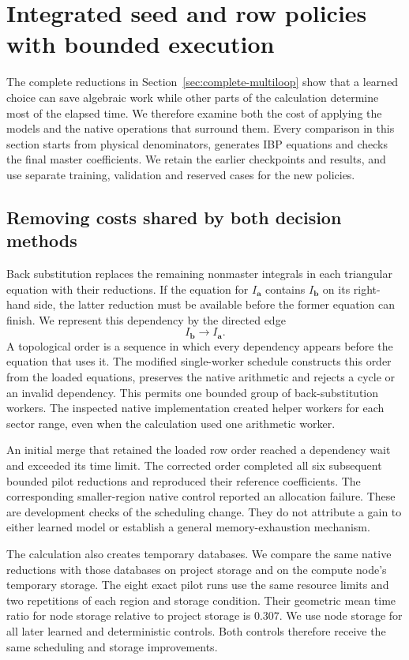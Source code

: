 \section{Integrated seed and row policies with bounded execution}
\label{sec:integrated-runtime}
The complete reductions in Section~\ref{sec:complete-multiloop} show that a learned
choice can save algebraic work while other parts of the calculation determine
most of the elapsed time. We therefore examine both the cost of applying the
models and the native operations that surround them. Every comparison in this
section starts from physical denominators, generates IBP equations and checks
the final master coefficients. We retain the earlier checkpoints and results,
and use separate training, validation and reserved cases for the new policies.

\subsection{Removing costs shared by both decision methods}
Back substitution replaces the remaining nonmaster integrals in each triangular
equation with their reductions. If the equation for $I_{\boldsymbol a}$ contains
$I_{\boldsymbol b}$ on its right-hand side, the latter reduction must be available
before the former equation can finish. We represent this dependency by the
directed edge
\[
 I_{\boldsymbol b}\longrightarrow I_{\boldsymbol a}.
\]
A topological order is a sequence in which every dependency appears before the
equation that uses it. The modified single-worker schedule constructs this order
from the loaded equations, preserves the native arithmetic and rejects a cycle
or an invalid dependency. This permits one bounded group of back-substitution
workers. The inspected native implementation created helper workers for each
sector range, even when the calculation used one arithmetic worker.

An initial merge that retained the loaded row order reached a dependency wait
and exceeded its time limit. The corrected order completed all six subsequent
bounded pilot reductions and reproduced their reference coefficients. The
corresponding smaller-region native control reported an allocation failure.
These are development checks of the scheduling change. They do not attribute a
gain to either learned model or establish a general memory-exhaustion mechanism.

The calculation also creates temporary databases. We compare the same native
reductions with those databases on project storage and on the compute node's
temporary storage. The eight exact pilot runs use the same resource limits and
two repetitions of each region and storage condition. Their geometric mean time
ratio for node storage relative to project storage is $0.307$. We use node
storage for all later learned and deterministic controls. Both controls therefore
receive the same scheduling and storage improvements.

